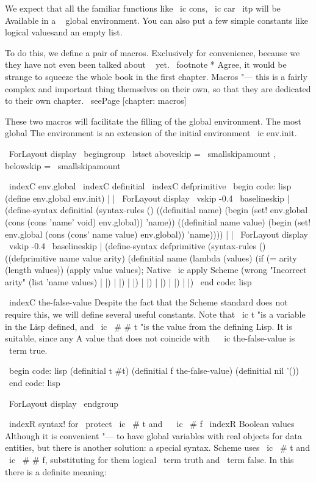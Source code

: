 {{We expect that all the familiar functions like \ ic {cons}, \ ic {car} { \ itp } will be
Available in a ~ global environment. You can also put a few simple
constants like logical values ​​and an empty list.

To do this, we define a pair of macros. Exclusively for convenience, because we
they have not even been talked about ~ yet. \ footnote * {Agree, it would be strange to squeeze
the whole book in the first chapter.} Macros "--- this is a fairly complex and important thing themselves
on their own, so that they are dedicated to their own chapter. \ seePage [chapter: macros]

These two macros will facilitate the filling of the global environment. The most global
The environment is an extension of the initial environment \ ic {env.init}.

\ ForLayout {display} { \ begingroup
\ lstset {aboveskip = \ smallskipamount , belowskip = \ smallskipamount }}

\ indexC {env.global}
\ indexC {definitial}
\ indexC {defprimitive}
\ begin {code: lisp}
(define env.global env.init)
| | \ ForLayout {display} { \ vskip -0.4 \ baselineskip } |
(define-syntax definitial
  (syntax-rules ()
    ((definitial name)
     (begin (set! env.global (cons (cons 'name' void) env.global))
            'name))
    ((definitial name value)
     (begin (set! env.global (cons (cons' name value) env.global))
            'name))))
| | \ ForLayout {display} { \ vskip -0.4 \ baselineskip } |
(define-syntax defprimitive
  (syntax-rules ()
    ((defprimitive name value arity)
     (definitial name
        (lambda (values)
          (if (= arity (length values))
              (apply value values); Native \ ic {apply} Scheme
              (wrong "Incorrect arity" (list 'name values) | \: |) | \: |) | \: |) | \: |) | \: |) | \: |) | \: |)
\ end {code: lisp}

\ indexC {the-false-value}
Despite the fact that the Scheme standard does not require this, we will define several
useful constants. Note that \ ic {t} "is a variable in the Lisp defined,
and \ ic { \ # # t} "is the value from the defining Lisp. It is suitable, since any
A value that does not coincide with ~ \ ic {the-false-value} is \ term {true}.

\ begin {code: lisp}
(definitial t #t)
(definitial f the-false-value)
(definitial nil '())
\ end {code: lisp}

\ ForLayout {display} { \ endgroup }

\ indexR {syntax! for \ protect \ ic { \ # t} and ~ \ ic { \ # f}}
\ indexR {Boolean values}
Although it is convenient "--- to have global variables with real objects for
data entities, but there is another solution: a special syntax. Scheme uses
\ ic { \ # t} and \ ic { \ # # f}, substituting for them logical \ term {truth} and
\ term {false}. In this there is a definite meaning:

}}
